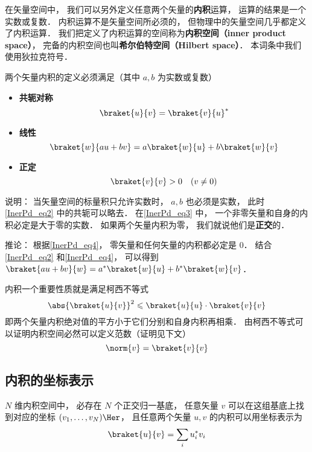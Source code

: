 

在矢量空间中， 我们可以另外定义任意两个矢量的\textbf{内积}运算， 运算的结果是一个实数或复数． 内积运算不是矢量空间所必须的， 但物理中的矢量空间几乎都定义了内积运算． 我们把定义了内积运算的空间称为\textbf{内积空间（inner product space）}， 完备的内积空间也叫\textbf{希尔伯特空间（Hilbert space）}． 本词条中我们使用狄拉克符号．

两个矢量内积的定义必须满足（其中 $a, b$ 为实数或复数）

\begin{itemize}
\item \textbf{共轭对称}
\begin{equation}\label{InerPd_eq2}
\braket{u}{v} = \braket{v}{u}^*
\end{equation}
\item \textbf{线性}
\begin{equation}\label{InerPd_eq4}
\braket{w}{a u + b v} = a\braket{w}{u} + b\braket{w}{v}
\end{equation}
\item \textbf{正定}
\begin{equation}\label{InerPd_eq3}
\braket{v}{v} > 0 \quad (v \ne 0)
\end{equation}
\end{itemize}

说明： 当矢量空间的标量积只允许实数时， $a, b$ 也必须是实数， 此时\autoref{InerPd_eq2} 中的共轭可以略去． 在\autoref{InerPd_eq3} 中， 一个非零矢量和自身的内积必定是大于零的实数． 如果两个矢量内积为零， 我们就说他们是\textbf{正交}的．

推论： 根据\autoref{InerPd_eq4}， 零矢量和任何矢量的内积都必定是 0． 结合\autoref{InerPd_eq2} 和\autoref{InerPd_eq4}， 可以得到 $\braket{a u + b v}{w} = a^*\braket{w}{u} + b^*\braket{w}{v}$．

内积一个重要性质就是满足柯西不等式
\begin{equation}
\abs{\braket{u}{v}}^2 \leqslant \braket{u}{u} \cdot \braket{v}{v}
\end{equation}
即两个矢量内积绝对值的平方小于它们分别和自身内积再相乘． 由柯西不等式可以证明内积空间必然可以定义范数（证明见下文）
\begin{equation}
\norm{v} = \braket{v}{v}
\end{equation}

\subsection{内积的坐标表示}
$N$ 维内积空间中， 必存在 $N$ 个正交归一基底， 任意矢量 $v$ 可以在这组基底上找到对应的坐标 $(v_1, \dots, v_N)\Her$， 且任意两个矢量 $u, v$ 的内积可以用坐标表示为
\begin{equation}
\braket{u}{v} = \sum_i u_i^* v_i
\end{equation}


